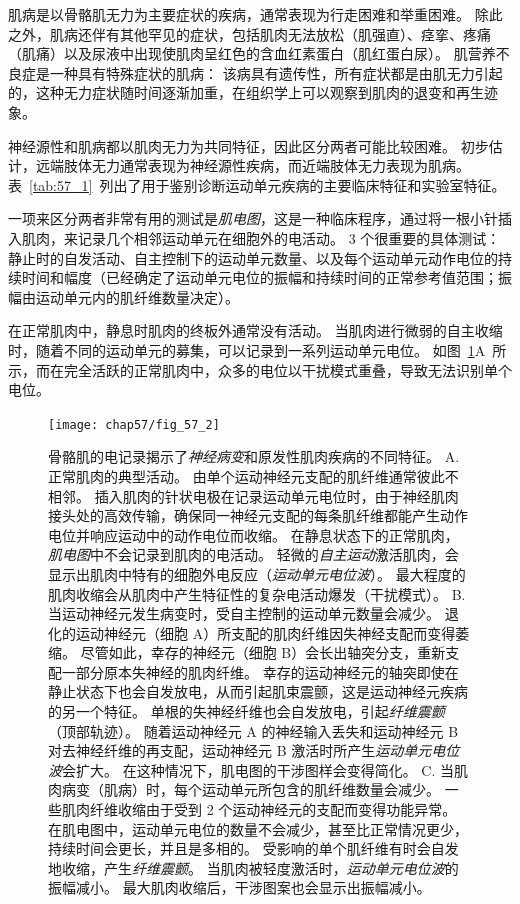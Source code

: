 肌病是以骨骼肌无力为主要症状的疾病，通常表现为行走困难和举重困难。
除此之外，肌病还伴有其他罕见的症状，包括肌肉无法放松（肌强直）、痉挛、疼痛（肌痛）以及尿液中出现使肌肉呈红色的含血红素蛋白（肌红蛋白尿）。
肌营养不良症是一种具有特殊症状的肌病：
该病具有遗传性，所有症状都是由肌无力引起的，这种无力症状随时间逐渐加重，在组织学上可以观察到肌肉的退变和再生迹象。


神经源性和肌病都以肌肉无力为共同特征，因此区分两者可能比较困难。
初步估计，远端肢体无力通常表现为神经源性疾病，而近端肢体无力表现为肌病。
表~\ref{tab:57_1}~列出了用于鉴别诊断运动单元疾病的主要临床特征和实验室特征。


一项来区分两者非常有用的测试是\textit{肌电图}，这是一种临床程序，通过将一根小针插入肌肉，来记录几个相邻运动单元在细胞外的电活动。
3 个很重要的具体测试：静止时的自发活动、自主控制下的运动单元数量、以及每个运动单元动作电位的持续时间和幅度（已经确定了运动单元电位的振幅和持续时间的正常参考值范围；振幅由运动单元内的肌纤维数量决定）。


在正常肌肉中，静息时肌肉的终板外通常没有活动。
当肌肉进行微弱的自主收缩时，随着不同的运动单元的募集，可以记录到一系列运动单元电位。
如图~\ref{fig:57_2}A~所示，而在完全活跃的正常肌肉中，众多的电位以干扰模式重叠，导致无法识别单个电位。


\begin{figure}[htbp]
	\centering
	\texttt{[image: chap57/fig\_57\_2]}
	\caption{骨骼肌的电记录揭示了\textit{神经病变}和原发性肌肉疾病的不同特征。
		A. 正常肌肉的典型活动。
		由单个运动神经元支配的肌纤维通常彼此不相邻。
		插入肌肉的针状电极在记录运动单元电位时，由于神经肌肉接头处的高效传输，确保同一神经元支配的每条肌纤维都能产生动作电位并响应运动中的动作电位而收缩。
		在静息状态下的正常肌肉，\textit{肌电图}中不会记录到肌肉的电活动。
		轻微的\textit{自主运动}激活肌肉，会显示出肌肉中特有的细胞外电反应（\textit{运动单元电位波}）。
		最大程度的肌肉收缩会从肌肉中产生特征性的复杂电活动爆发（干扰模式）。
		B. 当运动神经元发生病变时，受自主控制的运动单元数量会减少。
		退化的运动神经元（细胞 A）所支配的肌肉纤维因失神经支配而变得萎缩。
		尽管如此，幸存的神经元（细胞 B）会长出轴突分支，重新支配一部分原本失神经的肌肉纤维。
		幸存的运动神经元的轴突即使在静止状态下也会自发放电，从而引起肌束震颤，这是运动神经元疾病的另一个特征。
		单根的失神经纤维也会自发放电，引起\textit{纤维震颤}（顶部轨迹）。
		随着运动神经元 A 的神经输入丢失和运动神经元 B 对去神经纤维的再支配，运动神经元 B 激活时所产生\textit{运动单元电位波}会扩大。
		在这种情况下，肌电图的干涉图样会变得简化。
		C. 当肌肉病变（肌病）时，每个运动单元所包含的肌纤维数量会减少。
		一些肌肉纤维收缩由于受到 2 个运动神经元的支配而变得功能异常。
		在肌电图中，运动单元电位的数量不会减少，甚至比正常情况更少，持续时间会更长，并且是多相的。
		受影响的单个肌纤维有时会自发地收缩，产生\textit{纤维震颤}。
		当肌肉被轻度激活时，\textit{运动单元电位波}的振幅减小。
		最大肌肉收缩后，干涉图案也会显示出振幅减小。}
	\label{fig:57_2}
\end{figure}


